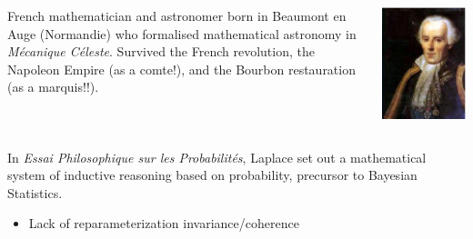 \begin{slide}

\begin{block}{}
\begin{columns}
French mathematician and astronomer born in Beaumont en Auge (Normandie)
who formalised mathematical astronomy in {\em M\'ecanique C\'eleste}. 
Survived the French revolution, the Napoleon Empire (as a comte!), and
the Bourbon restauration (as a marquis!!).

\includegraphics[height=3truecm]{figures/Laplace}
\end{columns}

\medskip
\pause
In {\em Essai Philosophique sur les Probabilit\'es}, Laplace set out a mathematical system of inductive 
reasoning based on probability, precursor to Bayesian Statistics. 
\end{block}

\end{slide}\begin{slide}

\begin{itemize}
\item  Lack of reparameterization invariance/coherence
{}


\end{itemize}
\end{slide}
